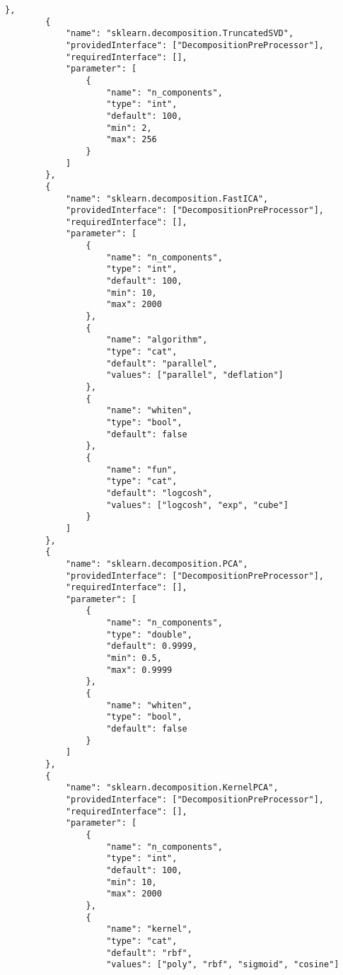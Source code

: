 \begin{Verbatim}[fontsize=\scriptsize]
        },
        {
            "name": "sklearn.decomposition.TruncatedSVD",
            "providedInterface": ["DecompositionPreProcessor"],
            "requiredInterface": [],
            "parameter": [
                {
                    "name": "n_components",
                    "type": "int",
                    "default": 100,
                    "min": 2,
                    "max": 256
                }
            ]
        },
        {
            "name": "sklearn.decomposition.FastICA",
            "providedInterface": ["DecompositionPreProcessor"],
            "requiredInterface": [],
            "parameter": [
                {
                    "name": "n_components",
                    "type": "int",
                    "default": 100,
                    "min": 10,
                    "max": 2000
                },
                {
                    "name": "algorithm",
                    "type": "cat",
                    "default": "parallel",
                    "values": ["parallel", "deflation"]
                },
                {
                    "name": "whiten",
                    "type": "bool",
                    "default": false
                },
                {
                    "name": "fun",
                    "type": "cat",
                    "default": "logcosh",
                    "values": ["logcosh", "exp", "cube"]
                }
            ]
        },
        {
            "name": "sklearn.decomposition.PCA",
            "providedInterface": ["DecompositionPreProcessor"],
            "requiredInterface": [],
            "parameter": [
                {
                    "name": "n_components",
                    "type": "double",
                    "default": 0.9999,
                    "min": 0.5,
                    "max": 0.9999
                },
                {
                    "name": "whiten",
                    "type": "bool",
                    "default": false
                }
            ]
        },
        {
            "name": "sklearn.decomposition.KernelPCA",
            "providedInterface": ["DecompositionPreProcessor"],
            "requiredInterface": [],
            "parameter": [
                {
                    "name": "n_components",
                    "type": "int",
                    "default": 100,
                    "min": 10,
                    "max": 2000
                },
                {
                    "name": "kernel",
                    "type": "cat",
                    "default": "rbf",
                    "values": ["poly", "rbf", "sigmoid", "cosine"]

\end{Verbatim}
